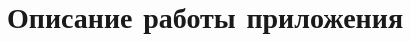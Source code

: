 \documentclass[12pt]{report}
\begin{document}
    \section{Описание работы приложения}

\end{document}
